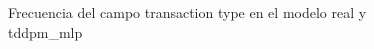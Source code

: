 \begin{figure}[H]
    \centering
    
    \caption{Frecuencia del campo transaction type en el modelo real y tddpm\_mlp}
    \label{frecuency-Transaction Type-tddpm_mlp}
\end{figure}
